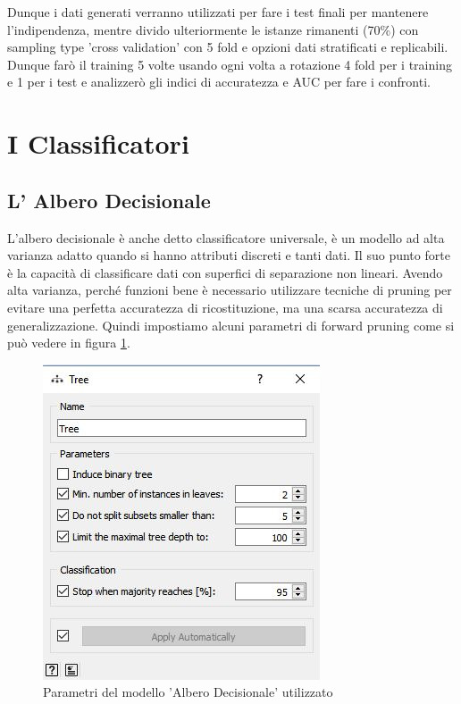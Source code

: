 \documentclass[a4paper, 12p]{report}
\begin{document}
	Dunque i dati generati verranno utilizzati per fare i test finali per mantenere l'indipendenza, mentre divido ulteriormente le istanze rimanenti (70\%) con sampling type 'cross validation' con 5 fold e opzioni dati stratificati e replicabili. Dunque farò il training 5 volte usando ogni volta a rotazione 4 fold per i training e 1 per i test e analizzerò gli indici di accuratezza e AUC per fare i confronti.
	
	\section{I Classificatori}
		\subsection{L' Albero Decisionale}
		L'albero decisionale è anche detto classificatore universale, è un modello ad alta varianza adatto quando si hanno attributi discreti e tanti dati. Il suo punto forte è la capacità di classificare dati con superfici di separazione non lineari. Avendo alta varianza, perché funzioni bene è necessario utilizzare tecniche di pruning per evitare una perfetta accuratezza di ricostituzione, ma una scarsa accuratezza di generalizzazione. Quindi impostiamo alcuni parametri di forward pruning come si può vedere in figura \ref{fig:6}.
\begin{figure}	
	\centering
	\includegraphics[scale = 0.8]{img/Tree.JPG}
	\caption{Parametri del modello 'Albero Decisionale' utilizzato }\label{fig:6}
\end{figure}
\end{document}
